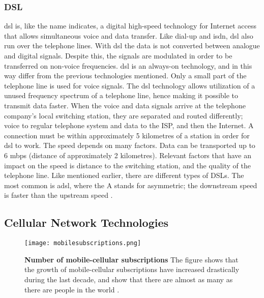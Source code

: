 \subsubsection{DSL}
\gls{dsl} is, like the name indicates, a digital high-speed technology for Internet access that allows simultaneous voice and data transfer. Like dial-up and \gls{isdn}, \gls{dsl} also run over the telephone lines. With \gls{dsl} the data is not converted between analogue and digital signals. Despite this, the signals are modulated in order to be transferred on non-voice frequencies. \gls{dsl} is an always-on technology, and in this way differ from the previous technologies mentioned. Only a small part of the telephone line is used for voice signals. The \gls{dsl} technology allows utilization of a unused frequency spectrum of a telephone line, hence making it possible to transmit data faster. When the voice and data signals arrive at the telephone company's local switching station, they are separated and routed differently; voice to regular telephone system and data to the ISP, and then the Internet. A connection must be within approximately 5 kilometres of a station in order for \gls{dsl} to work. The speed depends on many factors. Data can be transported up to 6 \gls{mbps} (distance of approximately 2 kilometres). Relevant factors that have an impact on the speed is distance to the switching station, and the quality of the telephone line. Like mentioned earlier, there are different types of DSLs. The most common is \gls{adsl}, where the A stands for asymmetric; the downstream speed is faster than the upstream speed \cite{differentuplinks}.



\subsection{Cellular Network Technologies}

\begin{figure}[b]
  \centering
      \texttt{[image: mobilesubscriptions.png]}
  \caption [Number of mobile-cellular subscriptions]{\textbf{Number of mobile-cellular subscriptions} The figure shows that the growth of mobile-cellular subscriptions have increased drastically during the last decade, and show that there are almost as many as there are people in the world \cite{itu2013}.}
  \label{fig:subscribers}
\end{figure}


